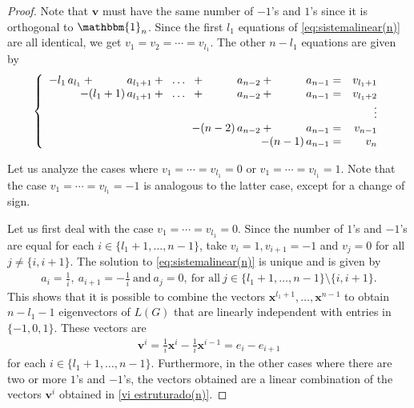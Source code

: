 \documentclass[preprint]{elsarticle}
\begin{document}
\begin{proof}
Note that $\mathbf{v}$ must have the same number of $-1$'s and $1$'s since it is orthogonal to $ \mathbbm{1}_n$. Since the first $l_1$ equations of \eqref{eq:sistemalinear(n)}  are all identical, we get $v_{1}=v_{2}=\cdots=v_{l_1}.$ The other $n-l_1$ equations are given by
\begin{equation}  \label{somas(n)}
\left\{\begin{array}{rrrrrrrrrrrr}
  -l_1 \, a_{l_1} + \hspace{1cm}  a_{l_1+1} + \hspace{0.2cm} \ldots \hspace{0.2cm} + \hspace{1cm} a_{n-2} + \hspace{1cm} a_{n-1} = & v_{l_1+1}   \\
                  -(l_1+1) \, a_{l_1+1} + \hspace{0.2cm} \ldots \hspace{0.2cm} + \hspace{1cm} a_{n-2} + \hspace{1cm} a_{n-1} = & v_{l_1+2}   \\
                                    &             \vdots                            \\
                                         -(n-2) \, a_{n-2}  + \hspace{1cm} a_{n-1}   = & v_{n-1}   \\
                                                       -(n-1) \, a_{n-1}  = & v_{n}
\end{array}\right.
\end{equation}

Let us analyze the cases where $v_1 = \cdots =v_{l_1} = 0$ or $v_1 = \cdots = v_{l_1} = 1.$ Note that the case $v_1 = \cdots = v_{l_1} = -1$  is analogous to the latter case, except for a change of sign.

Let us first deal with the case $v_1 = \cdots =v_{l_1} = 0.$ Since the number of $1$'s and $-1$'s are equal for each $i \in \{l_1+1,\ldots,n-1\}$, take $v_{i} = 1, v_{i+1} = -1$ and $v_{j} = 0$ for all $j \ne \{i, i+1\}.$ The solution to  \eqref{eq:sistemalinear(n)} is unique and is given by
\begin{align*}
    a_{i}=\frac{1}{i}, \ a_{i+1} = -\frac{1}{i} \ \text{and} \ a_{j}=0, \ \text{for all} \  j \in \{l_1+1, \ldots, n-1\} \setminus \{i, i+1\}.  
\end{align*}
This shows that it is possible to combine the vectors $\mathbf{x}^{l_1+1},\ldots,\mathbf{x}^{n-1}$ to obtain $n-l_1-1$ eigenvectors of $L(G)$ that are linearly independent with entries in $\{-1,0,1\}$. These vectors are
\begin{align}\label{vi estruturado(n)}
    \mathbf{v}^{i} = \frac{1}{i}\mathbf{x}^i-\frac{1}{i}\mathbf{x}^{i-1} = e_i-e_{i+1}
\end{align}
for each $i \in \{l_1+1,\ldots,n-1\}.$
Furthermore, in the other cases where there are two or more $1$'s and $-1$'s, the vectors obtained are a linear combination of the vectors $\mathbf{v}^{i}$ obtained in \eqref{vi estruturado(n)}.


\end{proof}
\end{document}
